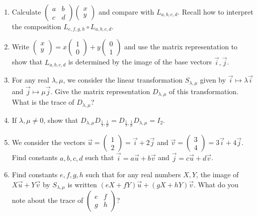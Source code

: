 \begin{enumerate}
\item Calculate $\begin{pmatrix}
  a & b \\
  c & d
\end{pmatrix} \begin{pmatrix}
  x \\
  y
\end{pmatrix}$ and compare with $L_{a,b,c,d}$.
  Recall how to interpret the composition
  ${L_{e,f,g,h}} \circ {L_{a,b,c,d}}$.
\item
  Write $\begin{pmatrix}
  x \\
  y
  \end{pmatrix}  = x \begin{pmatrix}
  1 \\
  0
  \end{pmatrix} + y \begin{pmatrix}
  0 \\
  1
  \end{pmatrix}$ and use
  the matrix representation to show that $L_{a,b,c,d}$ is determined by
  the image of the base vectors $\vec{i},\vec{j}$.

\item For any real $\lambda, \mu$, we consider the linear transformation
  $S_{\lambda,\mu}$ given by $\vec{i} \mapsto \lambda\vec{i}$ and
  $\vec{j} \mapsto \mu \vec{j}$. Give the matrix representation
  $D_{\lambda,\mu}$ of this transformation. What is the trace of
  $D_{\lambda,\mu}$?
\item If $\lambda, \mu \neq 0$, show that
  $D_{\lambda,\mu} D_{\frac{1}{\lambda},\frac{1}{\mu}} =
  D_{\frac{1}{\lambda},\frac{1}{\mu}} D_{\lambda,\mu} = I_2$.
\item We consider the vectors $\vec{u} = \begin{pmatrix}
  1 \\ 2 \end{pmatrix} = \vec{i} + 2\vec{j}$ and $\vec{v} = \begin{pmatrix}
  3 \\ 4 \end{pmatrix} = 3\vec{i} + 4\vec{j}$. Find constants
  $a,b,c,d$ such that
  $\vec{i} = a\vec{u} + b\vec{v}$ and
  $\vec{j} = c\vec{u} + d\vec{v}$.

\item Find constants $e,f,g,h$ such that
  for any real numbers $X,Y$, the image of
  $X\vec{u} + Y\vec{v}$ by $S_{\lambda,\mu}$ is written
  ${(eX + fY)}\vec{u} + {(gX+hY)}\vec{v}$. What do you note about the trace of
  $\begin{pmatrix} e & f \\ g & h \end{pmatrix}$?


\end{enumerate}
